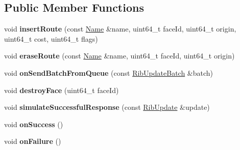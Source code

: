 \subsection*{Public Member Functions}
\begin{DoxyCompactItemize}
\item 
void {\bfseries insert\+Route} (const \hyperlink{classndn_1_1Name}{Name} \&name, uint64\+\_\+t face\+Id, uint64\+\_\+t origin, uint64\+\_\+t cost, uint64\+\_\+t flags)\hypertarget{classnfd_1_1rib_1_1tests_1_1FibUpdatesFixture_a803c3a97d370a0644d8d9001dbb6ce5e}{}\label{classnfd_1_1rib_1_1tests_1_1FibUpdatesFixture_a803c3a97d370a0644d8d9001dbb6ce5e}

\item 
void {\bfseries erase\+Route} (const \hyperlink{classndn_1_1Name}{Name} \&name, uint64\+\_\+t face\+Id, uint64\+\_\+t origin)\hypertarget{classnfd_1_1rib_1_1tests_1_1FibUpdatesFixture_a19d63d3c8749929d9f45663cb4d33bd3}{}\label{classnfd_1_1rib_1_1tests_1_1FibUpdatesFixture_a19d63d3c8749929d9f45663cb4d33bd3}

\item 
void {\bfseries on\+Send\+Batch\+From\+Queue} (const \hyperlink{classnfd_1_1rib_1_1RibUpdateBatch}{Rib\+Update\+Batch} \&batch)\hypertarget{classnfd_1_1rib_1_1tests_1_1FibUpdatesFixture_a478ce1911d1b3118b5afa104c17a1b2f}{}\label{classnfd_1_1rib_1_1tests_1_1FibUpdatesFixture_a478ce1911d1b3118b5afa104c17a1b2f}

\item 
void {\bfseries destroy\+Face} (uint64\+\_\+t face\+Id)\hypertarget{classnfd_1_1rib_1_1tests_1_1FibUpdatesFixture_af8dcb5d612ca1f045ec9b0d4f76571b2}{}\label{classnfd_1_1rib_1_1tests_1_1FibUpdatesFixture_af8dcb5d612ca1f045ec9b0d4f76571b2}

\item 
void {\bfseries simulate\+Successful\+Response} (const \hyperlink{classnfd_1_1rib_1_1RibUpdate}{Rib\+Update} \&update)\hypertarget{classnfd_1_1rib_1_1tests_1_1FibUpdatesFixture_adb77847425b569dd29829bd1ba8606cd}{}\label{classnfd_1_1rib_1_1tests_1_1FibUpdatesFixture_adb77847425b569dd29829bd1ba8606cd}

\item 
void {\bfseries on\+Success} ()\hypertarget{classnfd_1_1rib_1_1tests_1_1FibUpdatesFixture_a5103e5b7f0ef09155c4615710dcf4633}{}\label{classnfd_1_1rib_1_1tests_1_1FibUpdatesFixture_a5103e5b7f0ef09155c4615710dcf4633}

\item 
void {\bfseries on\+Failure} ()\hypertarget{classnfd_1_1rib_1_1tests_1_1FibUpdatesFixture_a2510cdd58e6ea1321584b70677cc3616}{}\label{classnfd_1_1rib_1_1tests_1_1FibUpdatesFixture_a2510cdd58e6ea1321584b70677cc3616}


\end{DoxyCompactItemize}
